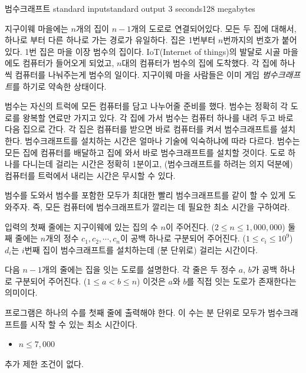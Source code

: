 \begin{problem}{범수크래프트}
	{standard input}{standard output}
	{3 seconds}{128 megabytes}{}
	
	지구이웨 마을에는 $n$개의 집이 $n-1$개의 도로로 연결되어있다. 모든 두 집에 대해서, 하나로 부터 다른 하나로 가는 경로가 유일하다. 집은 1번부터 $n$번까지의 번호가 붙어있다. 1번 집은 마을 이장 범수의 집이다. IoT(Internet of things)의 발달로 시골 마을에도 컴퓨터가 들어오게 되었고, $n$대의 컴퓨터가 범수의 집에 도착했다. 각 집에 하나씩 컴퓨터를 나눠주는게 범수의 일이다. 지구이웨 마을 사람들은 이미 게임 \textit{범수크래프트}를 하기로 약속한 상태이다.
	
	범수는 자신의 트럭에 모든 컴퓨터를 담고 나누어줄 준비를 했다. 범수는 정확히 각 도로를 왕복할 연료만 가지고 있다. 각 집에 가서 범수는 컴퓨터 하나를 내려 두고 바로 다음 집으로 간다. 각 집은 컴퓨터를 받으면 바로 컴퓨터를 켜서 범수크래프트를 설치한다. 범수크래프트를 설치하는 시간은 얼마나 기술에 익숙하냐에 따라 다르다. 범수는 모든 집에 컴퓨터를 배달하고 집에 와서 바로 범수크래프트를 설치할 것이다. 도로 하나를 다니는데 걸리는 시간은 정확히 1분이고, (범수크래프트를 하려는 의지 덕분에) 컴퓨터를 트럭에서 내리는 시간은 무시할 수 있다.
	
	범수를 도와서 범수를 포함한 모두가 최대한 빨리 범수크래프트를 같이 할 수 있게 도와주자. 즉, 모든 컴퓨터에 범수크래프트가 깔리는 데 필요한 최소 시간을 구하여라.
	
	\InputFile
	입력의 첫째 줄에는 지구이웨에 있는 집의 수 $n$이 주어진다. ($2 \le n \le 1,000,000$) 둘째 줄에는 $n$개의 정수 $c_1, c_2, \cdots, c_n$이 공백 하나로 구분되어 주어진다. ($1 \le c_i \le 10^9$) $d_i$는 $i$번째 집이 범수크래프트를 설치하는데 (분 단위로) 걸리는 시간이다.
	
	다음 $n-1$개의 줄에는 집을 잇는 도로를 설명한다. 각 줄은 두 정수 $a$, $b$가 공백 하나로 구분되어 주어진다. ($1 \le a < b \le n $) 이것은 $a$와 $b$를 직접 잇는 도로가 존재한다는 의미이다.
	
	
	\OutputFile
	
	프로그램은 하나의 수를 첫째 줄에 출력해야 한다. 이 수는 분 단위로 모두가 범수크래프트를 시작 할 수 있는 최소 시간이다.
	
	\begin{itemize}
		\item $n \le 7,000$
	\end{itemize}
	
	추가 제한 조건이 없다.
	
	
	
	\Examples
	

\end{problem}
